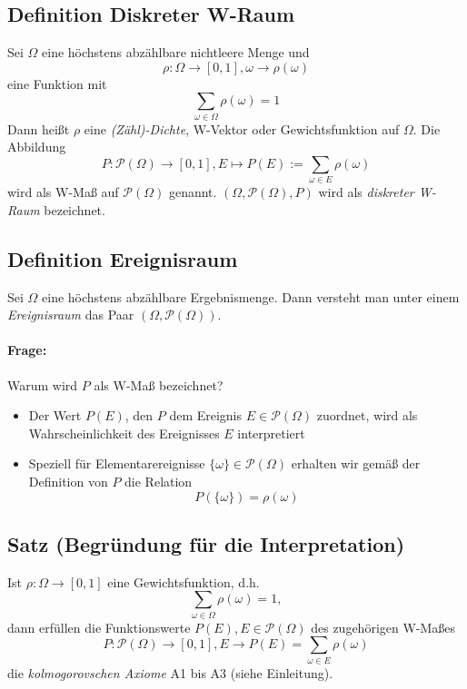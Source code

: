 \documentclass[12pt,a4paper]{article}
\begin{document}
	\subsection{Definition Diskreter W-Raum}
	Sei $\Omega$ eine höchstens abzählbare nichtleere Menge und
	$$\rho :\Omega\rightarrow[0,1],\omega\rightarrow\rho (\omega)$$
	eine Funktion mit
	$$\sum_{\omega\in\Omega}\rho (\omega)=1$$
	Dann heißt $\rho$ eine \textit{(Zähl)-Dichte}, W-Vektor oder Gewichtsfunktion auf $\Omega$.
	Die Abbildung
	$$P: \mathcal{P}(\Omega)\rightarrow[0,1], E\mapsto P(E):=\sum_{\omega\in E}\rho(\omega)$$
	wird als W-Maß auf $\mathcal{P}(\Omega)$ genannt. $(\Omega,\mathcal{P}(\Omega),P)$ wird als 
	\textit{diskreter W-Raum} bezeichnet.
	
	\subsection{Definition Ereignisraum}
	Sei $\Omega$ eine höchstens abzählbare Ergebnismenge. Dann versteht man unter einem \textit{Ereignisraum}
	das Paar $(\Omega,\mathcal{P}(\Omega))$.
	\paragraph{Frage: }
	Warum wird $P$ als W-Maß bezeichnet?
	\begin{itemize}
		\item Der Wert $P(E)$, den $P$ dem Ereignis $E\in\mathcal{P}(\Omega)$ zuordnet, wird als 							Wahrscheinlichkeit des Ereignisses $E$ interpretiert
		\item Speziell für Elementarereignisse $\{\omega\}\in\mathcal{P}(\Omega)$ erhalten wir gemäß der
		Definition von $P$ die Relation
		$$P(\{\omega\})=\rho(\omega)$$
	\end{itemize}
	\subsection{Satz (Begründung für die Interpretation)}
	\label{3dot4}
	Ist $\rho :\Omega\rightarrow[0,1]$ eine Gewichtsfunktion, d.h. $$\sum_{\omega\in\Omega}\rho(\omega)=1,$$
	dann erfüllen die Funktionswerte $P(E),E\in\mathcal{P}(\Omega)$ des zugehörigen W-Maßes 
	$$P:\mathcal{P}(\Omega)\rightarrow[0,1],E\rightarrow P(E)=\sum_{\omega\in E}\rho(\omega)$$
	die \textit{kolmogorovschen Axiome} A1 bis A3 (siehe Einleitung).
\end{document}
